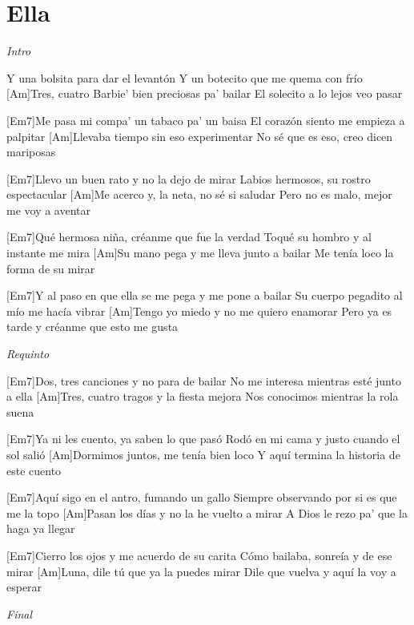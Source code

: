 \section{Ella}

\noindent
\vspace{1cm}

\begin{guitar}
	\begin{multicols}{2}

		\textit{Intro}
		\par
		[Em7]Y una bolsita para dar el levantón
		Y un botecito que me quema con frío
		[Am]Tres, cuatro Barbie' bien preciosas pa' bailar
		El solecito a lo lejos veo pasar

		[Em7]Me pasa mi compa' un tabaco pa' un baisa
		El corazón siento me empieza a palpitar
		[Am]Llevaba tiempo sin eso experimentar
		No sé que es eso, creo dicen mariposas

		[Em7]Llevo un buen rato y no la dejo de mirar
		Labios hermosos, su rostro espectacular
		[Am]Me acerco y, la neta, no sé si saludar
		Pero no es malo, mejor me voy a aventar

		[Em7]Qué hermosa niña, créanme que fue la verdad
		Toqué su hombro y al instante me mira
		[Am]Su mano pega y me lleva junto a bailar
		Me tenía loco la forma de su mirar

		[Em7]Y al paso en que ella se me pega y me pone a bailar
		Su cuerpo pegadito al mío me hacía vibrar
		[Am]Tengo yo miedo y no me quiero enamorar
		Pero ya es tarde y créanme que esto me gusta

		\par
		\textit{Requinto}
		\par

		[Em7]Dos, tres canciones y no para de bailar
		No me interesa mientras esté junto a ella
		[Am]Tres, cuatro tragos y la fiesta mejora
		Nos conocimos mientras la rola suena

		[Em7]Ya ni les cuento, ya saben lo que pasó
		Rodó en mi cama y justo cuando el sol salió
		[Am]Dormimos juntos, me tenía bien loco
		Y aquí termina la historia de este cuento

		[Em7]Aquí sigo en el antro, fumando un gallo
		Siempre observando por si es que me la topo
		[Am]Pasan los días y no la he vuelto a mirar
		A Dios le rezo pa' que la haga ya llegar
	
		[Em7]Cierro los ojos y me acuerdo de su carita
		Cómo bailaba, sonreía y de ese mirar
		[Am]Luna, dile tú que ya la puedes mirar
		Dile que vuelva y aquí la voy a esperar

		\par
		\textit{Final}
	\end{multicols}
\end{guitar}
